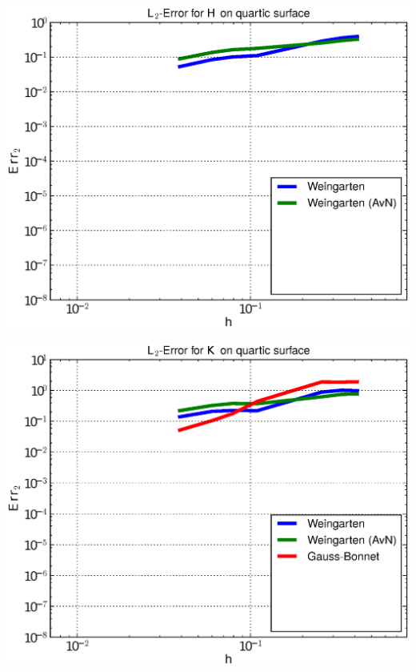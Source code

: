 \documentclass{beamer}
\begin{document}
\begin{frame}
\begin{overprint}
\begin{minipage}[t]{0.49\textwidth}
            \centering\includegraphics[width=\textwidth]{bilder/Curvature/heineB/ErrHL2_2.eps}
          \end{minipage}
          \begin{minipage}[t]{0.49\textwidth}
            \centering\includegraphics[width=\textwidth]{bilder/Curvature/heineB/ErrKL2_3.eps}
          \end{minipage}\hfill
          \begin{minipage}[t]{0.49\textwidth}

\end{minipage}
\end{overprint}
\end{frame}
\end{document}
